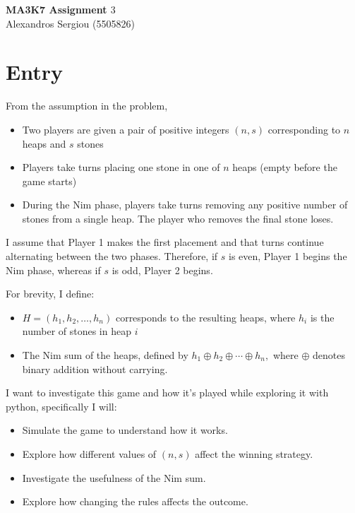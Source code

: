 \documentclass[11pt]{article}
\newcommand{\keywordfont}{\textsc}
\newcommand{\keyword}[1]{%
  \marginpar{\raggedright\small\keywordfont{#1}}}
\begin{document}
\Large
\begin{center}
\textbf{MA3K7 Assignment $3$}
\\
Alexandros Sergiou (5505826)
\end{center}
\normalsize

\section{Entry}

\keyword{I KNOW}From the assumption in the problem,
\begin{itemize}
\item Two players are given a pair of positive integers $(n,s)$ corresponding to $n$ heaps and $s$ stones
\item Players take turns placing one stone in one of $n$ heaps (empty before the game starts) 
\item During the Nim phase, players take turns removing any positive number of stones from a single heap. The player who removes the final stone loses.
\end{itemize}
I assume that Player 1 makes the first placement and that turns continue alternating between the two phases. Therefore, if $s$ is even, Player 1
begins the Nim phase, whereas if $s$ is odd, Player 2 begins.

\medskip
\keyword{NOTATION}
For brevity, I define:

\begin{itemize}
    
\item $H=(h_1,h_2,\dots,h_n)$ corresponds to the resulting heaps, where $h_i$ is the number of stones in heap $i$
\item The Nim sum of the heaps, defined by
$h_1 \oplus h_2 \oplus \cdots \oplus h_n,$
where $\oplus$ denotes binary addition without carrying.
\end{itemize}
\medskip
\keyword{I WANT} I want to investigate this game and how it's played while exploring it with python, specifically I will:
\begin{itemize}
\item Simulate the game to understand how it works.    
\item Explore how different values of $(n,s)$ affect the winning strategy.
\item Investigate the usefulness of the Nim sum.
\item Explore how changing the rules affects the outcome.
\end{itemize}
\end{document}
